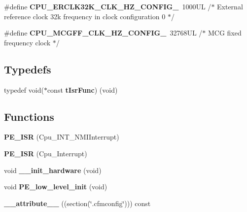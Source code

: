 \begin{DoxyCompactItemize}
\item 
\mbox{\label{group___cpu__module_ga092702a75fd1041eb311850abb022240}} 
\#define {\bfseries C\+P\+U\+\_\+\+E\+R\+C\+L\+K32\+K\+\_\+\+C\+L\+K\+\_\+\+H\+Z\+\_\+\+C\+O\+N\+F\+I\+G\+\_}~1000\+U\+L /$\ast$ External reference clock 32k frequency in clock configuration 0 $\ast$/
\item 
\mbox{\label{group___cpu__module_gafd8ec2ac4ea47574f95d0e5a6f80807e}} 
\#define {\bfseries C\+P\+U\+\_\+\+M\+C\+G\+F\+F\+\_\+\+C\+L\+K\+\_\+\+H\+Z\+\_\+\+C\+O\+N\+F\+I\+G\+\_}~32768\+U\+L /$\ast$ M\+C\+G fixed frequency clock $\ast$/
\end{DoxyCompactItemize}
\subsection*{Typedefs}
\begin{DoxyCompactItemize}
\item 
\mbox{\label{group___cpu__module_gafea04d3e8135767c03ce099f02e97437}} 
typedef void($\ast$const {\bfseries t\+Isr\+Func}) (void)
\end{DoxyCompactItemize}
\subsection*{Functions}
\begin{DoxyCompactItemize}
\item 
\mbox{\label{group___cpu__module_ga89f6e345028fe4a0a105f4f95e1bb85c}} 
{\bfseries P\+E\+\_\+\+I\+SR} (Cpu\+\_\+\+I\+N\+T\+\_\+\+N\+M\+I\+Interrupt)
\item 
\mbox{\label{group___cpu__module_gafa0067fa0d355a26ca9894983c01be6f}} 
{\bfseries P\+E\+\_\+\+I\+SR} (Cpu\+\_\+\+Interrupt)
\item 
\mbox{\label{group___cpu__module_ga32a8d86789a3326b3120bf1e1c1d4252}} 
void {\bfseries \+\_\+\+\_\+init\+\_\+hardware} (void)
\item 
\mbox{\label{group___cpu__module_ga95039f54c45f24c1b4ed640fa2f63f11}} 
void {\bfseries P\+E\+\_\+low\+\_\+level\+\_\+init} (void)
\item 
\mbox{\label{group___cpu__module_ga2d9b5b981f451cdf47bf43b4f9cc9e03}} 
{\bfseries \+\_\+\+\_\+attribute\+\_\+\+\_\+} ((section(\char`\"{}.cfmconfig\char`\"{}))) const
\end{DoxyCompactItemize}
